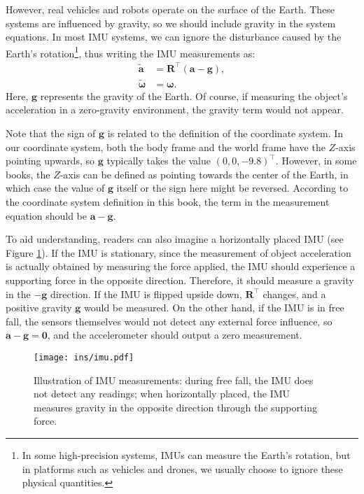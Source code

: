 However, real vehicles and robots operate on the surface of the Earth. These systems are influenced by gravity, so we should include gravity in the system equations. In most IMU systems, we can ignore the disturbance caused by the Earth's rotation\footnote{In some high-precision systems, IMUs can measure the Earth's rotation, but in platforms such as vehicles and drones, we usually choose to ignore these physical quantities.}, thus writing the IMU measurements as:
\begin{subequations}\label{eq:3.2}
	\begin{align}
		\tilde{\bm{a}} &= \bm{R}^\top (\bm{a} - \bm{g}), \\
		\tilde{\boldsymbol{\omega}} &= \boldsymbol{\omega}.
	\end{align}
\end{subequations}
Here, $\bm{g}$ represents the gravity of the Earth. Of course, if measuring the object's acceleration in a zero-gravity environment, the gravity term would not appear.

Note that the sign of $\bm{g}$ is related to the definition of the coordinate system. In our coordinate system, both the body frame and the world frame have the $Z$-axis pointing upwards, so $\bm{g}$ typically takes the value $(0, 0, -9.8)^\top$. However, in some books, the $Z$-axis can be defined as pointing towards the center of the Earth, in which case the value of $\bm{g}$ itself or the sign here might be reversed. According to the coordinate system definition in this book, the term in the measurement equation should be $\bm{a}-\bm{g}$.

To aid understanding, readers can also imagine a horizontally placed IMU (see Figure \ref{fig:imu}). If the IMU is stationary, since the measurement of object acceleration is actually obtained by measuring the force applied, the IMU should experience a supporting force in the opposite direction. Therefore, it should measure a gravity in the $-\bm{g}$ direction. If the IMU is flipped upside down, $\bm{R}^\top$ changes, and a positive gravity $\bm{g}$ would be measured. On the other hand, if the IMU is in free fall, the sensors themselves would not detect any external force influence, so $\bm{a}-\bm{g}=\bm{0}$, and the accelerometer should output a zero measurement.

\begin{figure}
	\centering
	\texttt{[image: ins/imu.pdf]}
	\caption{Illustration of IMU measurements: during free fall, the IMU does not detect any readings; when horizontally placed, the IMU measures gravity in the opposite direction through the supporting force.}
	\label{fig:imu}
\end{figure}

